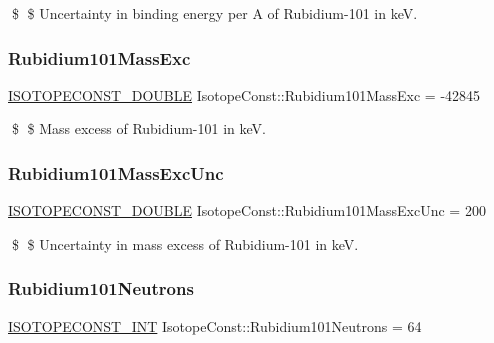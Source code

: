 \$ \$ Uncertainty in binding energy per A of Rubidium-\/101 in keV. \mbox{\label{group___isotope_const-_rubidium-_rb101_ga7cc7ce7f7e750ff2be4babedd300e062}} 
\subsubsection{\texorpdfstring{Rubidium101\+Mass\+Exc}{Rubidium101MassExc}}
{\footnotesize\ttfamily \mbox{\hyperlink{group___isotope_const-_macros_ga8f45a7272ce02c0b4c65c44636ed719a}{I\+S\+O\+T\+O\+P\+E\+C\+O\+N\+S\+T\+\_\+\+D\+O\+U\+B\+LE}} Isotope\+Const\+::\+Rubidium101\+Mass\+Exc = -\/42845}

\$ \$ Mass excess of Rubidium-\/101 in keV. \mbox{\label{group___isotope_const-_rubidium-_rb101_gaee22178044b08c8c4f067128515b8ceb}} 
\subsubsection{\texorpdfstring{Rubidium101\+Mass\+Exc\+Unc}{Rubidium101MassExcUnc}}
{\footnotesize\ttfamily \mbox{\hyperlink{group___isotope_const-_macros_ga8f45a7272ce02c0b4c65c44636ed719a}{I\+S\+O\+T\+O\+P\+E\+C\+O\+N\+S\+T\+\_\+\+D\+O\+U\+B\+LE}} Isotope\+Const\+::\+Rubidium101\+Mass\+Exc\+Unc = 200}

\$ \$ Uncertainty in mass excess of Rubidium-\/101 in keV. \mbox{\label{group___isotope_const-_rubidium-_rb101_ga0eaf1534a5663c4476fc9fb31bb8168d}} 
\subsubsection{\texorpdfstring{Rubidium101\+Neutrons}{Rubidium101Neutrons}}
{\footnotesize\ttfamily \mbox{\hyperlink{group___isotope_const-_macros_ga5f18360b3e99483a35c32d789e62621c}{I\+S\+O\+T\+O\+P\+E\+C\+O\+N\+S\+T\+\_\+\+I\+NT}} Isotope\+Const\+::\+Rubidium101\+Neutrons = 64}

